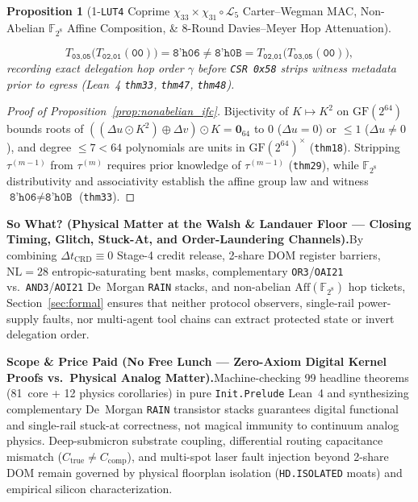 \documentclass[11pt,letterpaper]{article}
\providecommand{\LeanTheoremTotal}{81}
\theoremstyle{spectralthm}
\newtheorem{proposition}[theorem]{Proposition}
\begin{document}
\begin{proposition}[1-\texttt{LUT4} Coprime $\chi_{33}\times\chi_{31}\circ\mathcal{L}_5$ Carter--Wegman MAC, Non-Abelian $\mathbb{F}_{2^8}$ Affine Composition, \& 8-Round Davies--Meyer Hop Attenuation]
\begin{enumerate}
  \[
  T_{\texttt{03},\texttt{05}}\bigl(T_{\texttt{02},\texttt{01}}(\texttt{00})\bigr) = \texttt{8'h06} \neq \texttt{8'h0B}
  = T_{\texttt{02},\texttt{01}}\bigl(T_{\texttt{03},\texttt{05}}(\texttt{00})\bigr),
  \]
  recording exact delegation hop order $\gamma$ before \texttt{CSR 0x58} strips witness metadata prior to egress (Lean~4 \texttt{thm33}, \texttt{thm47}, \texttt{thm48}).
\end{enumerate}
\end{proposition}
\begin{proof}[Proof of Proposition~\ref{prop:nonabelian_ifc}]
Bijectivity of $K \mapsto K^2$ on $\mathrm{GF}(2^{64})$ bounds roots of $((\Delta u \odot K^2) \oplus \Delta v)\odot K = \mathbf{0}_{64}$ to $0$ ($\Delta u = 0$) or $\le 1$ ($\Delta u \neq 0$), and degree $\le 7 < 64$ polynomials are units in $\mathrm{GF}(2^{64})^\times$ (\texttt{thm18}). Stripping $\tau^{(m-1)}$ from $\tau^{(m)}$ requires prior knowledge of $\tau^{(m-1)}$ (\texttt{thm29}), while $\mathbb{F}_{2^8}$ distributivity and associativity establish the affine group law and witness $\texttt{8'h06} \neq \texttt{8'h0B}$ (\texttt{thm33}).
\end{proof}

\noindent\textbf{So What? (Physical Matter at the Walsh \& Landauer Floor --- Closing Timing, Glitch, Stuck-At, and Order-Laundering Channels).}\;By combining $\Delta t_{\mathrm{CRD}} \equiv 0$ Stage-4 credit release, 2-share DOM register barriers, $\mathrm{NL}=28$ entropic-saturating bent masks, complementary \texttt{OR3}/\texttt{OAI21} vs.\ \texttt{AND3}/\texttt{AOI21} De~Morgan \texttt{RAIN} stacks, and non-abelian $\mathrm{Aff}(\mathbb{F}_{2^8})$ hop tickets, Section~\ref{sec:formal} ensures that neither protocol observers, single-rail power-supply faults, nor multi-agent tool chains can extract protected state or invert delegation order.

\noindent\textbf{Scope \& Price Paid (No Free Lunch --- Zero-Axiom Digital Kernel Proofs vs.\ Physical Analog Matter).}\;Machine-checking 99 headline theorems (\LeanTheoremTotal\ core + 12 physics corollaries) in pure \texttt{Init.Prelude} Lean~4 and synthesizing complementary De~Morgan \texttt{RAIN} transistor stacks guarantees digital functional and single-rail stuck-at correctness, not magical immunity to continuum analog physics. Deep-submicron substrate coupling, differential routing capacitance mismatch ($C_{\mathrm{true}} \neq C_{\mathrm{comp}}$), and multi-spot laser fault injection beyond 2-share DOM remain governed by physical floorplan isolation (\texttt{HD.ISOLATED} moats) and empirical silicon characterization.
\end{document}
